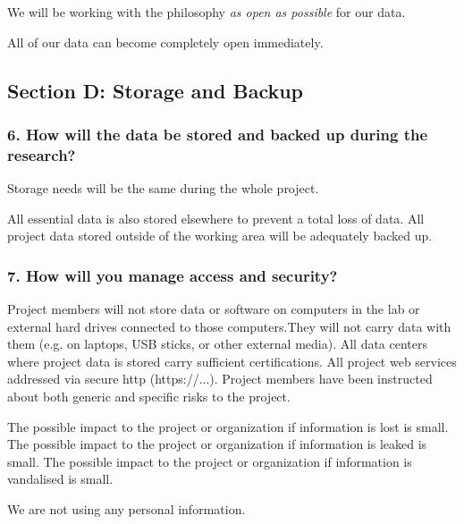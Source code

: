 \documentclass[
]{article}
\begin{document}
We will be working with the philosophy \emph{as open as possible} for
our data.

All of our data can become completely open immediately.

\hypertarget{sec-storage-backup}{}
\hypertarget{section-d-storage-and-backup}{%
\subsection{Section D: Storage and
Backup}\label{section-d-storage-and-backup}}

\hypertarget{q-store-backup}{}
\hypertarget{how-will-the-data-be-stored-and-backed-up-during-the-research}{%
\subsubsection{6. How will the data be stored and backed up during the
research?}\label{how-will-the-data-be-stored-and-backed-up-during-the-research}}

Storage needs will be the same during the whole project.

All essential data is also stored elsewhere to prevent a total loss of
data. All project data stored outside of the working area will be
adequately backed up.

\hypertarget{q-access-security}{}
\hypertarget{how-will-you-manage-access-and-security}{%
\subsubsection{7. How will you manage access and
security?}\label{how-will-you-manage-access-and-security}}

Project members will not store data or software on computers in the lab
or external hard drives connected to those computers.They will not carry
data with them (e.g. on laptops, USB sticks, or other external media).
All data centers where project data is stored carry sufficient
certifications. All project web services addressed via secure http
(https://...). Project members have been instructed about both generic
and specific risks to the project.

The possible impact to the project or organization if information is
lost is small. The possible impact to the project or organization if
information is leaked is small. The possible impact to the project or
organization if information is vandalised is small.

We are not using any personal information.
\end{document}
